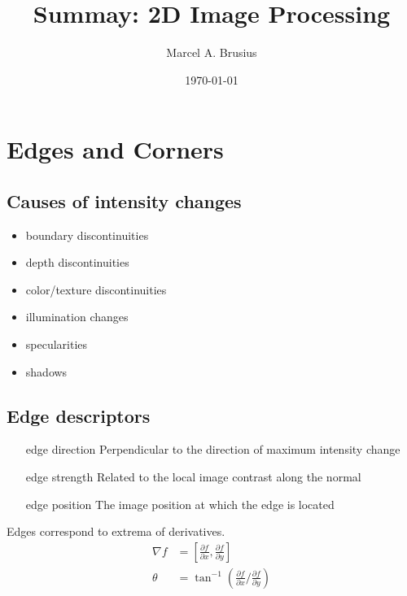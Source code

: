 \documentclass[12pt]{article}
\begin{document}
	\author[1]{Marcel A. Brusius}
	\date{\today}
	\title{Summay: 2D Image Processing}
	\maketitle
	
	\section{Edges and Corners}
	\subsection{Causes of intensity changes}
	
	\begin{itemize}
		\item boundary discontinuities
		\item depth discontinuities
		\item color/texture discontinuities
		\item illumination changes
		\item specularities
		\item shadows
	\end{itemize}
	
	\subsection{Edge descriptors}
	
	\begin{itemize}
		\item[edge direction] Perpendicular to the direction of maximum intensity change
		\item[edge strength] Related to the local image contrast along the normal
		\item[edge position] The image position at which the edge is located
	\end{itemize}

	Edges correspond to extrema of derivatives.
	\begin{align}
		\nabla f &=\left[\frac{\partial f}{\partial x}, \frac{\partial f}{\partial y} \right] \\
		\theta &= \tan^{-1}\left( \frac{\partial f}{\partial x} / \frac{\partial f}{\partial y} \right)
	\end{align}
	
\end{document}

